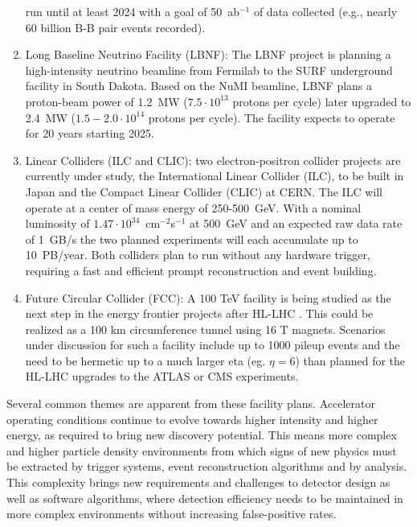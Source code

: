 \begin{enumerate}
run until at least 2024 with a goal of 50~ab$^{-1}$ of data collected (e.g., nearly 60 billion B-B pair events recorded). 
\item
Long Baseline Neutrino Facility (LBNF): The LBNF project \cite{DUNE2016} is planning a high-intensity neutrino beamline from Fermilab to the SURF underground facility in South Dakota. 
Based on the NuMI beamline, LBNF plans a proton-beam power of 1.2~MW ($7.5\cdot 10^{13}$ protons per cycle) later upgraded to 2.4~MW ($1.5-2.0 \cdot 10^{14}$ protons per cycle). The facility expects 
to operate for 20 years starting 2025.
\item 
Linear Colliders (ILC and CLIC): two electron-positron collider projects are currently under study, the International Linear Collider (ILC), to be built in Japan and the Compact 
Linear Collider (CLIC) at CERN. The ILC will operate at a center of mass energy of 250-500~GeV. With a nominal luminosity of $1.47\cdot 10^{34}$~cm$^{-2}$s$^{-1}$ at 500~GeV and an expected raw data 
rate of 1~GB/s the two planned experiments will each accumulate up to 10~PB/year. Both colliders plan to run without any hardware trigger, requiring a fast and efficient prompt 
reconstruction and event building.
\item
Future Circular Collider (FCC): A 100 TeV facility is being studied as the next step in the energy frontier projects after HL-LHC \cite{Ball2014}. This could be realized as a 100 km 
circumference tunnel using 16 T magnets. Scenarios under discussion for such a facility include up to 1000 pileup events and the need to be hermetic up to a much larger eta 
(eg. $\eta=6$) than planned for the HL-LHC upgrades to the ATLAS or CMS experiments. 
\end{enumerate}
Several common themes are apparent from these facility plans. Accelerator operating conditions continue to evolve towards higher intensity and higher energy, as required to bring
new discovery potential. This means more complex and higher particle density environments from which signs of new physics must be extracted by trigger systems, event reconstruction 
algorithms and by analysis. This complexity brings new requirements and challenges to detector design as well as software algorithms, where detection efficiency needs to be maintained 
in more complex environments without increasing false-positive rates. 

